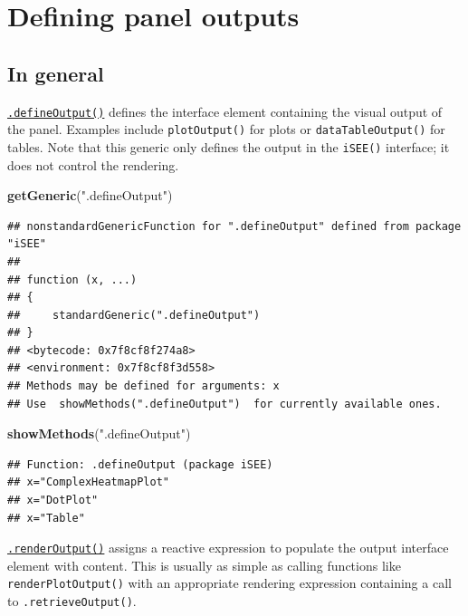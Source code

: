 \documentclass[
]{book}
\newenvironment{Shaded}{\begin{snugshade}}{\end{snugshade}}
\newcommand{\KeywordTok}[1]{\textcolor[rgb]{0.13,0.29,0.53}{\textbf{#1}}}
\newcommand{\NormalTok}[1]{#1}
\newcommand{\StringTok}[1]{\textcolor[rgb]{0.31,0.60,0.02}{#1}}
\begin{document}
\hypertarget{defining-panel-outputs}{%
\section{Defining panel outputs}\label{defining-panel-outputs}}

\hypertarget{in-general-1}{%
\subsection{In general}\label{in-general-1}}

\href{https://isee.github.io/iSEE/reference/output-generics.html}{\texttt{.defineOutput()}} defines the interface element containing the visual output of the panel.
Examples include \texttt{plotOutput()} for plots or \texttt{dataTableOutput()} for tables.
Note that this generic only defines the output in the \texttt{iSEE()} interface; it does not control the rendering.

\begin{Shaded}
\begin{Highlighting}[]
\KeywordTok{getGeneric}\NormalTok{(}\StringTok{".defineOutput"}\NormalTok{)}
\end{Highlighting}
\end{Shaded}

\begin{verbatim}
## nonstandardGenericFunction for ".defineOutput" defined from package "iSEE"
## 
## function (x, ...) 
## {
##     standardGeneric(".defineOutput")
## }
## <bytecode: 0x7f8cf8f274a8>
## <environment: 0x7f8cf8f3d558>
## Methods may be defined for arguments: x
## Use  showMethods(".defineOutput")  for currently available ones.
\end{verbatim}

\begin{Shaded}
\begin{Highlighting}[]
\KeywordTok{showMethods}\NormalTok{(}\StringTok{".defineOutput"}\NormalTok{)}
\end{Highlighting}
\end{Shaded}

\begin{verbatim}
## Function: .defineOutput (package iSEE)
## x="ComplexHeatmapPlot"
## x="DotPlot"
## x="Table"
\end{verbatim}

\href{https://isee.github.io/iSEE/reference/output-generics.html}{\texttt{.renderOutput()}} assigns a reactive expression to populate the output interface element with content.
This is usually as simple as calling functions like \texttt{renderPlotOutput()} with an appropriate rendering expression containing a call to \texttt{.retrieveOutput()}.
\end{document}

